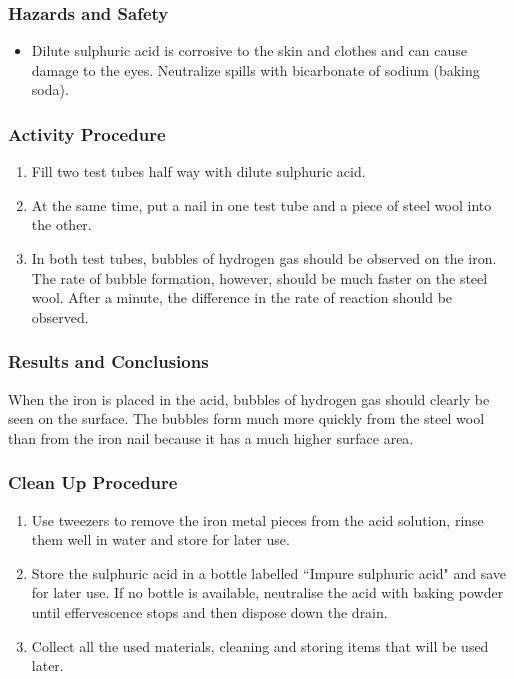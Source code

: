 \subsubsection*{Hazards and Safety}
\begin{itemize}
\item{Dilute sulphuric acid is corrosive to the skin and clothes and can cause damage to the eyes. Neutralize spills with bicarbonate of sodium (baking soda).}
\end{itemize}

\subsubsection*{Activity Procedure}
\begin{enumerate}
\item{Fill two test tubes half way with dilute sulphuric acid.}
\item{At the same time, put a nail in one test tube and a piece of steel wool into the other.}
\item{In both test tubes, bubbles of hydrogen gas should be observed on the iron. The rate of bubble formation, however, should be much faster on the steel wool. After a minute, the difference in the rate of reaction should be observed.}
\end{enumerate}

\subsubsection*{Results and Conclusions}
When the iron is placed in the acid, bubbles of hydrogen gas should clearly be seen on the surface. The bubbles form much more quickly from the steel wool than from the iron nail because it has a much higher surface area.

\subsubsection*{Clean Up Procedure}
\begin{enumerate}
\item{Use tweezers to remove the iron metal pieces from the acid solution, rinse them well in water and store for later use.}
\item{Store the sulphuric acid in a bottle labelled ``Impure sulphuric acid" and save for later use. If no bottle is available, neutralise the acid with baking powder until effervescence stops and then dispose down the drain.}
\item{Collect all the used materials, cleaning and storing items that will be used later.}
\end{enumerate}


